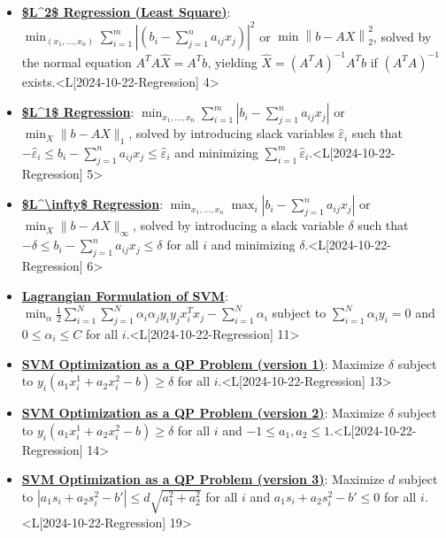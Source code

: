 \documentclass{article}%
\begin{document}
\begin{itemize}[[leftmargin=*]]%
\item \href{https://www.math.purdue.edu/~yipn/421/2024-10-22-Regression.pdf#page=4}{\textbf{\$L\^{}2\$ Regression (Least Square)}}: $\min_{(x_1, \dots, x_n)} \sum_{i=1}^m \left| (b_i - \sum_{j=1}^n a_{ij} x_j) \right|^2$ or $\min \left\| b - AX \right\|_2^2$, solved by the normal equation $A^T A \hat{X} = A^T b$, yielding $\hat{X} = (A^T A)^{-1} A^T b$ if $(A^T A)^{-1}$ exists.<L[2024-10-22-Regression] 4>%
\item \href{https://www.math.purdue.edu/~yipn/421/2024-10-22-Regression.pdf#page=5}{\textbf{\$L\^{}1\$ Regression}}: $\min_{x_1, \dots, x_n} \sum_{i=1}^m |b_i - \sum_{j=1}^n a_{ij} x_j|$ or $\min_X \|b - AX\|_1$, solved by introducing slack variables $\hat{\varepsilon}_i$ such that $-\hat{\varepsilon}_i \le b_i - \sum_{j=1}^n a_{ij} x_j \le \hat{\varepsilon}_i$ and minimizing $\sum_{i=1}^m \hat{\varepsilon}_i$.<L[2024-10-22-Regression] 5>%
\item \href{https://www.math.purdue.edu/~yipn/421/2024-10-22-Regression.pdf#page=6}{\textbf{\$L\^{}\textbackslash{}infty\$ Regression}}: $\min_{x_1, \dots, x_n} \max_{i} |b_i - \sum_{j=1}^n a_{ij} x_j|$ or $\min_X \|b - AX\|_\infty$, solved by introducing a slack variable $\delta$ such that $-\delta \le b_i - \sum_{j=1}^n a_{ij} x_j \le \delta$ for all $i$ and minimizing $\delta$.<L[2024-10-22-Regression] 6>%
\item \href{https://www.math.purdue.edu/~yipn/421/2024-10-22-Regression.pdf#page=11}{\textbf{Lagrangian Formulation of SVM}}: $\min_{\alpha} \frac{1}{2} \sum_{i=1}^N \sum_{j=1}^N \alpha_i \alpha_j y_i y_j x_i^T x_j - \sum_{i=1}^N \alpha_i$ subject to $\sum_{i=1}^N \alpha_i y_i = 0$ and $0 \le \alpha_i \le C$ for all $i$.<L[2024-10-22-Regression] 11>%
\item \href{https://www.math.purdue.edu/~yipn/421/2024-10-22-Regression.pdf#page=13}{\textbf{SVM Optimization as a QP Problem (version 1)}}: Maximize $\delta$ subject to $y_i (a_1 x_i^1 + a_2 x_i^2 - b) \ge \delta$ for all $i$.<L[2024-10-22-Regression] 13>%
\item \href{https://www.math.purdue.edu/~yipn/421/2024-10-22-Regression.pdf#page=14}{\textbf{SVM Optimization as a QP Problem (version 2)}}: Maximize $\delta$ subject to $y_i (a_1 x_i^1 + a_2 x_i^2 - b) \ge \delta$ for all $i$ and $-1 \le a_1, a_2 \le 1$.<L[2024-10-22-Regression] 14>%
\item \href{https://www.math.purdue.edu/~yipn/421/2024-10-22-Regression.pdf#page=19}{\textbf{SVM Optimization as a QP Problem (version 3)}}: Maximize $d$ subject to $|a_1 s_i + a_2 s_i^2 - b'| \le d \sqrt{a_1^2 + a_2^2}$ for all $i$ and $a_1 s_i + a_2 s_i^2 - b' \le 0$ for all $i$.<L[2024-10-22-Regression] 19>%

\end{itemize}
\end{document}

